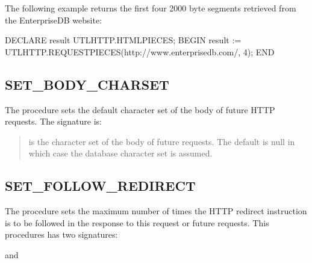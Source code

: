 \documentclass[letterpaper,10pt,english,openany,oneside]{sphinxmanual}
\begin{document}
The following example returns the first four 2000 byte segments
retrieved from the EnterpriseDB website:

%
\begin{sphinxVerbatim}[commandchars=\\\{\}]
DECLARE
    result UTL\PYGZus{}HTTP.HTML\PYGZus{}PIECES;
BEGIN
result := UTL\PYGZus{}HTTP.REQUEST\PYGZus{}PIECES(\PYGZsq{}http://www.enterprisedb.com/\PYGZsq{}, 4);
END
\end{sphinxVerbatim}


\subsection{SET\_BODY\_CHARSET}
\label{\detokenize{utl_http:set-body-charset}}
The  procedure sets the default character set of the
body of future HTTP requests. The signature is:
\begin{quote}

\end{quote}


\begin{quote}

 is the character set of the body of future requests. The
default is null in which case the database character set is assumed.
\end{quote}


\subsection{SET\_FOLLOW\_REDIRECT}
\label{\detokenize{utl_http:set-follow-redirect}}
The  procedure sets the maximum number of times the
HTTP redirect instruction is to be followed in the response to this
request or future requests. This procedures has two signatures:
\begin{quote}

\end{quote}

and
\begin{quote}

\end{quote}
\end{document}
